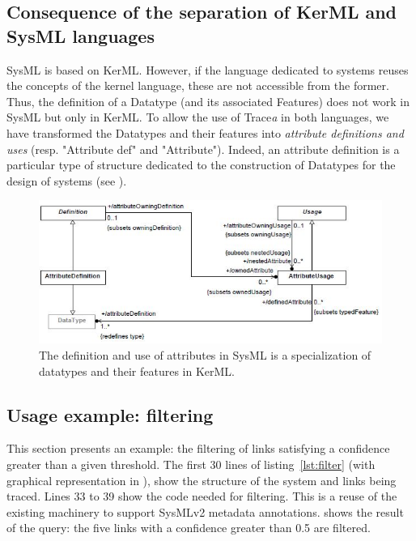 \subsection{Consequence of the separation of KerML and SysML languages}\label{sec:lggsep}
SysML is based on KerML. However, if the language dedicated to systems reuses the concepts of the kernel language, these are not accessible from the former. Thus, the definition of a Datatype (and its associated Features) does not work in SysML but only in KerML. To allow the use of Trace\textit{a} in both languages, we have transformed the Datatypes and their features into \textit{attribute definitions and uses} (resp. "Attribute def" and "Attribute"). Indeed, an attribute definition is a particular type of structure dedicated to the construction of Datatypes for the design of systems (see ).


\begin{figure}[h]     
	\centering
	\includegraphics[width=.9\linewidth]{images/dtnattributes.JPG}
	\caption{The definition and use of attributes in SysML is a specialization of datatypes and their features in KerML.}
	\label{fig:dtnattributes}
\end{figure} 

\subsection{Usage example: filtering}\label{sec:filter}
This section presents an example: the filtering of links satisfying a confidence greater than a given threshold.
The first 30 lines of listing~\ref{lst:filter} (with graphical representation in ), show the structure of the system and links being traced. Lines 33 to 39 show the code needed for filtering. This is a reuse of the existing machinery to support SysMLv2 metadata annotations.  shows the result of the query: the five links with a confidence greater than 0.5 are filtered.




